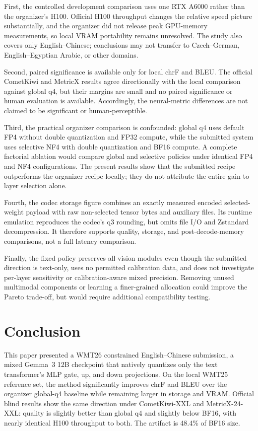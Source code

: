 \documentclass[11pt]{article}
\begin{document}
First, the controlled development comparison uses one RTX A6000 rather than the organizer's H100. Official H100 throughput changes the relative speed picture substantially, and the organizer did not release peak GPU-memory measurements, so local VRAM portability remains unresolved. The study also covers only English--Chinese; conclusions may not transfer to Czech--German, English--Egyptian Arabic, or other domains.

Second, paired significance is available only for local chrF and BLEU. The official CometKiwi and MetricX results agree directionally with the local comparison against global q4, but their margins are small and no paired significance or human evaluation is available. Accordingly, the neural-metric differences are not claimed to be significant or human-perceptible.

Third, the practical organizer comparison is confounded: global q4 uses default FP4 without double quantization and FP32 compute, while the submitted system uses selective NF4 with double quantization and BF16 compute. A complete factorial ablation would compare global and selective policies under identical FP4 and NF4 configurations. The present results show that the submitted recipe outperforms the organizer recipe locally; they do not attribute the entire gain to layer selection alone.

Fourth, the codec storage figure combines an exactly measured encoded selected-weight payload with raw non-selected tensor bytes and auxiliary files. Its runtime emulation reproduces the codec's q3 rounding, but omits file I/O and Zstandard decompression. It therefore supports quality, storage, and post-decode-memory comparisons, not a full latency comparison.

Finally, the fixed policy preserves all vision modules even though the submitted direction is text-only, uses no permitted calibration data, and does not investigate per-layer sensitivity or calibration-aware mixed precision. Removing unused multimodal components or learning a finer-grained allocation could improve the Pareto trade-off, but would require additional compatibility testing.

\section{Conclusion}

This paper presented a WMT26 constrained English--Chinese submission, a mixed Gemma~3 12B checkpoint that natively quantizes only the text transformer's MLP gate, up, and down projections. On the local WMT25 reference set, the method significantly improves chrF and BLEU over the organizer global-q4 baseline while remaining larger in storage and VRAM. Official blind results show the same direction under CometKiwi-XXL and MetricX-24-XXL: quality is slightly better than global q4 and slightly below BF16, with nearly identical H100 throughput to both. The artifact is 48.4\% of BF16 size.
\end{document}
